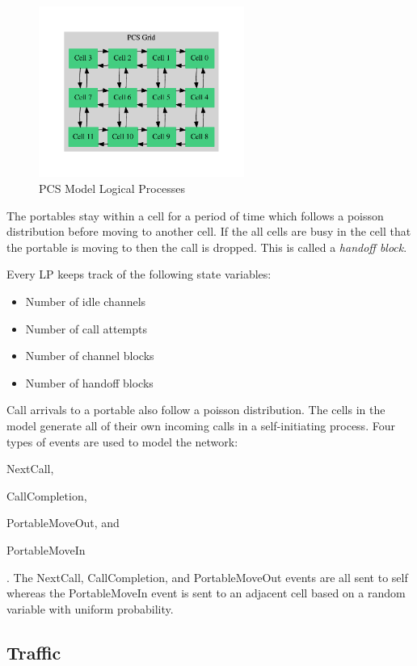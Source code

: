 \documentclass[11pt]{book}
\begin{document}
\begin{figure}
    \centering
    \includegraphics[width=0.6\textwidth,quiet]{figs/graphviz/pcs_model.pdf}
    \caption{PCS Model Logical Processes}\label{pcs_model_lps}
\end{figure}

The portables stay within a cell for a period of time which follows a poisson distribution
before moving to another cell. If the all cells are busy in the cell that the portable
is moving to then the call is dropped. This is called a \emph{handoff block}.

Every LP keeps track of the following state variables:
\begin{itemize}
    \item Number of idle channels
    \item Number of call attempts
    \item Number of channel blocks
    \item Number of handoff blocks
\end{itemize}

\noindent
Call arrivals to a portable also follow a poisson distribution. The cells in the model
generate all of their own incoming calls in a self-initiating process.
Four types of events are used to model the network: \begin{inparaenum}[(1)] \item NextCall,
\item CallCompletion, \item PortableMoveOut, and \item PortableMoveIn \end{inparaenum}.
The NextCall, CallCompletion, and PortableMoveOut events are all sent to self whereas
the PortableMoveIn event is sent to an adjacent cell based on a random variable with
uniform probability.

\subsection{Traffic}
\end{document}
